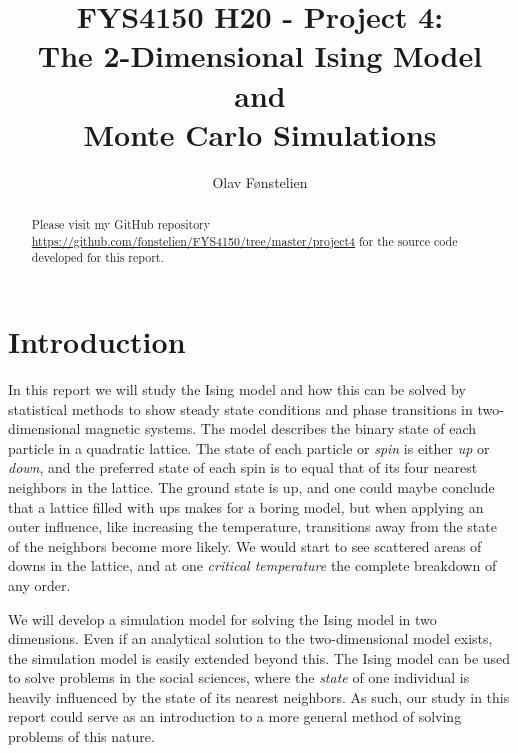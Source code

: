 \documentclass[]{article}
\title{FYS4150 H20 - Project 4:\\The 2-Dimensional Ising Model and \\Monte Carlo Simulations}
\author{Olav Fønstelien}
\begin{document}
\maketitle

\begin{abstract}


Please visit my GitHub repository \url{https://github.com/fonstelien/FYS4150/tree/master/project4} for the source code developed for this report.

\end{abstract}

\section{Introduction} \label{intro}

In this report we will study the Ising model and how this can be solved by statistical methods to show steady state conditions and phase transitions in two-dimensional magnetic systems. The model describes the binary state of each particle in a quadratic lattice. The state of each particle or \textit{spin} is either \textit{up} or \textit{down}, and the preferred state of each spin is to equal that of its four nearest neighbors in the lattice. The ground state is up, and one could maybe conclude that a lattice filled with ups makes for a boring model, but when applying an outer influence, like increasing the temperature, transitions away from the state of the neighbors become more likely. We would start to see scattered areas of downs in the lattice, and at one \textit{critical temperature} the complete breakdown of any order.

We will develop a simulation model for solving the Ising model in two dimensions. Even if an analytical solution to the two-dimensional model exists, the simulation model is easily extended beyond this. The Ising model can be used to solve problems in the social sciences, where the \textit{state} of one individual is heavily influenced by the state of its nearest neighbors. As such, our study in this report could serve as an introduction to a more general method of solving problems of this nature.
\end{document}
